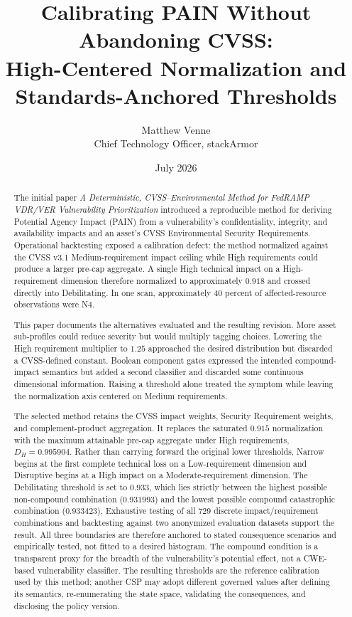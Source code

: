 \documentclass[11pt]{article}
\title{\bfseries Calibrating PAIN Without Abandoning CVSS:\\
High-Centered Normalization and\\
Standards-Anchored Thresholds}
\author{Matthew Venne \\ \small Chief Technology Officer, stackArmor}
\date{July 2026}
\begin{document}
\maketitle

\begin{abstract}
\noindent
The initial paper \emph{A Deterministic, CVSS--Environmental Method for FedRAMP
VDR/VER Vulnerability Prioritization} introduced a reproducible method for deriving
Potential Agency Impact (PAIN) from a vulnerability's confidentiality, integrity,
and availability impacts and an asset's CVSS Environmental Security Requirements.
Operational backtesting exposed a calibration defect: the method normalized against
the CVSS v3.1 Medium-requirement impact ceiling while High requirements could produce
a larger pre-cap aggregate. A single High technical impact on a High-requirement
dimension therefore normalized to approximately $0.918$ and crossed directly into
Debilitating. In one scan, approximately 40 percent of affected-resource observations
were N4.

This paper documents the alternatives evaluated and the resulting revision. More
asset sub-profiles could reduce severity but would multiply tagging choices. Lowering
the High requirement multiplier to $1.25$ approached the desired distribution but
discarded a CVSS-defined constant. Boolean component gates expressed the intended
compound-impact semantics but added a second classifier and discarded some continuous
dimensional information. Raising a threshold alone treated the symptom while leaving
the normalization axis centered on Medium requirements.

The selected method retains the CVSS impact weights, Security Requirement weights,
and complement-product aggregation. It replaces the saturated $0.915$ normalization
with the maximum attainable pre-cap aggregate under High requirements,
$D_H=0.995904$. Rather than carrying forward the original lower thresholds, Narrow
begins at the first complete technical loss on a Low-requirement dimension and
Disruptive begins at a High impact on a Moderate-requirement dimension. The
Debilitating threshold is set to $0.933$, which lies
strictly between the highest possible non-compound combination ($0.931993$) and the
lowest possible compound catastrophic combination ($0.933423$). Exhaustive testing
of all 729 discrete impact/requirement combinations and backtesting against two
anonymized evaluation datasets support the result. All three boundaries are therefore
anchored to stated consequence scenarios and empirically tested, not fitted to a
desired histogram. The compound condition is a transparent proxy for the breadth of
the vulnerability's potential effect, not a CWE-based vulnerability classifier.
The resulting thresholds are the reference calibration used by this method; another
CSP may adopt different governed values after defining its semantics, re-enumerating
the state space, validating the consequences, and disclosing the policy version.
\end{abstract}
\end{document}
